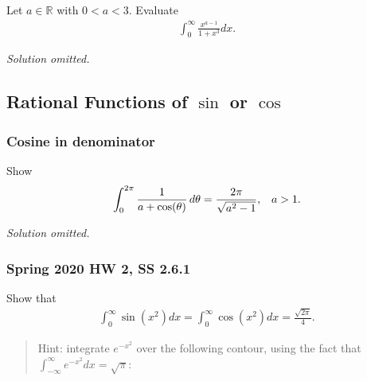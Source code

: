 \begin{problem}[?]

Let \(a \in \mathbb{R}\) with \(0<a<3\). Evaluate
\begin{align*}
\int_{0}^{\infty} \frac{x^{a-1}}{1+x^{3}} d x
.\end{align*}

\end{problem}

\emph{Solution omitted.}

\hypertarget{rational-functions-of-sin-or-cos}{%
\subsection{\texorpdfstring{Rational Functions of \(\sin\) or
\(\cos\)}{Rational Functions of \textbackslash sin or \textbackslash cos}}\label{rational-functions-of-sin-or-cos}}

\hypertarget{cosine-in-denominator}{%
\subsubsection{Cosine in denominator}\label{cosine-in-denominator}}

\begin{problem}[?]

Show
\begin{align*}
\int_0^{2\pi} {1\over a + \cos(\theta)} \,d\theta= {2\pi \over \sqrt{a^2-1}}, && a> 1
.\end{align*}

\end{problem}

\emph{Solution omitted.}

\hypertarget{spring-2020-hw-2-ss-2.6.1}{%
\subsubsection{Spring 2020 HW 2, SS
2.6.1}\label{spring-2020-hw-2-ss-2.6.1}}

Show that
\begin{align*}
\int_{0}^{\infty} \sin \left(x^{2}\right) d x=\int_{0}^{\infty} \cos \left(x^{2}\right) d x=\frac{\sqrt{2 \pi}}{4}
.\end{align*}

\begin{quote}
Hint: integrate \(e^{-x^2}\) over the following contour, using the fact
that \(\int_{-\infty}^{\infty} e^{-x^{2}} d x=\sqrt{\pi}\):
\end{quote}

